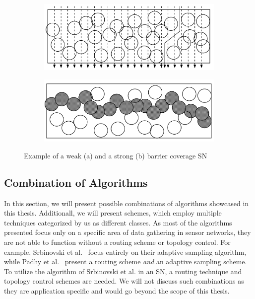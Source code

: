 \begin{figure}
\begin{subfigure}{.5\textwidth}
  \centering
  \includegraphics[width=.8\linewidth]{images/weak-coverage.png}
  \caption{}
  \label{fig:weak}
\end{subfigure}%
\begin{subfigure}{.5\textwidth}
  \centering
  \includegraphics[width=.8\linewidth]{images/strong-coverage.png}
  \caption{}
  \label{fig:strong}
\end{subfigure}
\caption{Example of a weak (a) and a strong (b) barrier coverage \ac{SN}}
\label{fig:coverage}
\end{figure}

\FloatBarrier

\subsection{Combination of Algorithms}
\label{sec:Combination of Algorithms}

In this section, we will present possible combinations of algorithms showcased
in this thesis. Additionall, we will present schemes, which employ multiple
techniques categorized by us as different classes. As most of the algorithms
presented focus only on a specific area of data gathering in sensor networks,
they are not able to function without a routing scheme or topology control. For
example, Srbinovski et al.~\cite{srbinovski2016energy} focus entirely on their
adaptive sampling algorithm, while Padhy et al.~\cite{padhy2006utility} present
a routing scheme \textit{and} an adaptive sampling scheme. To utilize the
algorithm of Srbinovski et al. in an \ac{SN}, a routing technique and topology
control schemes are needed. We will not discuss such combinations as they are
application specific and would go beyond the scope of this thesis.

